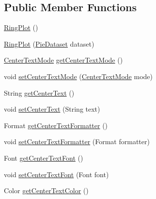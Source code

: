 \subsection*{Public Member Functions}
\begin{DoxyCompactItemize}
\item 
\mbox{\hyperlink{classorg_1_1jfree_1_1chart_1_1plot_1_1_ring_plot_aa197d815798695cbd5b0ce74f1d95f41}{Ring\+Plot}} ()
\item 
\mbox{\hyperlink{classorg_1_1jfree_1_1chart_1_1plot_1_1_ring_plot_a3336da43f51c25f1aec4d2a021574503}{Ring\+Plot}} (\mbox{\hyperlink{interfaceorg_1_1jfree_1_1data_1_1general_1_1_pie_dataset}{Pie\+Dataset}} dataset)
\item 
\mbox{\hyperlink{enumorg_1_1jfree_1_1chart_1_1plot_1_1_center_text_mode}{Center\+Text\+Mode}} \mbox{\hyperlink{classorg_1_1jfree_1_1chart_1_1plot_1_1_ring_plot_a005713e64db3d7e4bca3c7aa2cc7f6a8}{get\+Center\+Text\+Mode}} ()
\item 
void \mbox{\hyperlink{classorg_1_1jfree_1_1chart_1_1plot_1_1_ring_plot_a3e125a3e05da993d6ecf4fdf6c7d0d77}{set\+Center\+Text\+Mode}} (\mbox{\hyperlink{enumorg_1_1jfree_1_1chart_1_1plot_1_1_center_text_mode}{Center\+Text\+Mode}} mode)
\item 
String \mbox{\hyperlink{classorg_1_1jfree_1_1chart_1_1plot_1_1_ring_plot_ab01c313db9cb63e341853cc0260fd397}{get\+Center\+Text}} ()
\item 
void \mbox{\hyperlink{classorg_1_1jfree_1_1chart_1_1plot_1_1_ring_plot_abe4d56658a6bbf8776882110009b71bd}{set\+Center\+Text}} (String text)
\item 
Format \mbox{\hyperlink{classorg_1_1jfree_1_1chart_1_1plot_1_1_ring_plot_a9192f020615a88ccdc4a6ef4c6b099fb}{get\+Center\+Text\+Formatter}} ()
\item 
void \mbox{\hyperlink{classorg_1_1jfree_1_1chart_1_1plot_1_1_ring_plot_a83052ee445b23af33a885ef9d6b295c4}{set\+Center\+Text\+Formatter}} (Format formatter)
\item 
Font \mbox{\hyperlink{classorg_1_1jfree_1_1chart_1_1plot_1_1_ring_plot_a0eb37bf799886dcb40095966caf71fa1}{get\+Center\+Text\+Font}} ()
\item 
void \mbox{\hyperlink{classorg_1_1jfree_1_1chart_1_1plot_1_1_ring_plot_a485f817c67a6f8b873577d0d316552c7}{set\+Center\+Text\+Font}} (Font font)
\item 
Color \mbox{\hyperlink{classorg_1_1jfree_1_1chart_1_1plot_1_1_ring_plot_a8336b323aca0d3a58b5d84e1dd014e59}{get\+Center\+Text\+Color}} ()
\item 

\end{DoxyCompactItemize}
